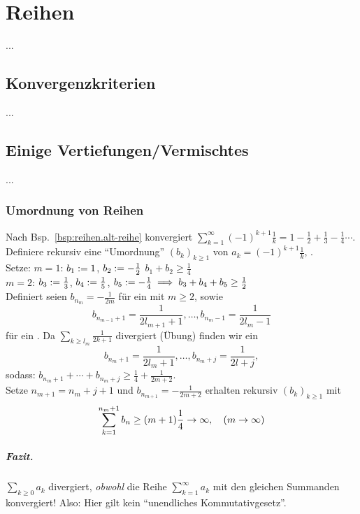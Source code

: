 \documentclass[12pt]{scrreprt}
\begin{document}
\chapter{Reihen}
...
\section{Konvergenzkriterien}
...

\section{Einige Vertiefungen/Vermischtes}
...

\subsection*{Umordnung von Reihen}
\begin{bsp}\label{bsp:reihen.umordn-altreihe}
Nach Bsp.~\ref{bsp:reihen.alt-reihe} konvergiert $\sum_{k=1}^\infty (-1)^{k+1} \frac{1}{k} = 1 - \frac{1}{2} + \frac{1}{3} - \frac{1}{4} \dotsb$.
Definiere rekursiv eine "`Umordnung"' $(b_k)_{k\ge 1}$ von $a_k = (-1)^{k+1}\frac{1}{k}$, .\\

\noindent Setze: $m = 1$: $b_1 := 1$, $b_2 := -\frac{1}{2}$ \folgt $b_1 + b_2 \ge \frac{1}{4}$\\
$m = 2$: $b_3 := \frac{1}{3}$, $b_4 := \frac{1}{5}$, $b_5 := -\frac{1}{4} \implies b_3 + b_4 + b_5 \ge \frac{1}{2}$\\

\noindent Definiert seien $b_{n_m} = -\frac{1}{2m}$ für ein  mit $m\ge 2$, sowie 
\[b_{n_{m-1}+1} = \frac{1}{2 l_{m+1} +1}, \dotsc, b_{n_{m}-1} = \frac{1}{2l_m -1}\] 
für ein . Da $\sum_{k\ge l_m} \frac{1}{2k+1}$ divergiert (Übung) finden wir ein 
\[b_{n_m +1} = \frac{1}{2l_m +1}, \dotsc, b_{n_m + j} = \frac{1}{2l+j},\] 
sodass: $b_{n_m+1} + \dotsb + b_{n_m + j} \ge \frac{1}{4} + \frac{1}{2m+2}.$\\

\noindent Setze $n_{m+1} = n_m + j +1$ und $b_{n_{m+1}} = -\frac{1}{2m+2}$
\folgt erhalten rekursiv $(b_k)_{k\ge 1}$ mit \[\sum_{k=1}^{n_m +1} b_n \ge (m+1)\frac{1}{4} \rightarrow \infty,\quad (m\rightarrow\infty)\]
\end{bsp}

\paragraph{Fazit.} $\sum_{k\ge 0}a_k$ divergiert, \emph{obwohl} die Reihe $\sum_{k=1}^\infty a_k$ mit
den gleichen Summanden konvergiert! Also: Hier gilt kein "`unendliches Kommutativgesetz"'.
\end{document}
